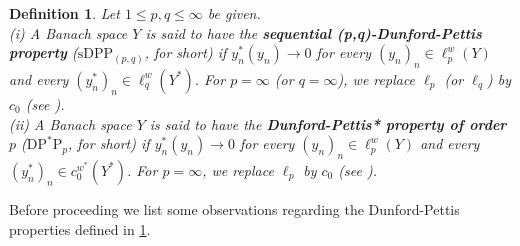 \documentclass[12 pt]{article}%
\newtheorem{final remark}[theorem]{Final Remark}
\newtheorem{definition}[theorem]{Definition}
\begin{document}
\begin{definition} \label{dppdef} \rm
    Let $1 \leq p, q \leq \infty$ be given. \\
    {\rm (i)} A Banach space $Y$ is said to have the {\bf sequential (p,q)-Dunford-Pettis property} ($\mathrm{sDPP}_{(p,q)}$, for short) if $y_n^*(y_n) \to 0$ for every $(y_n)_n \in \ell_p^w(Y)$ and every $(y_n^*)_n \in \ell_q^w( Y^*)$. For $p = \infty$ (or $q = \infty$), we replace $\ell_p$ (or $\ell_q$) by $c_0$ (see \cite[Definition 1.8]{gab2024}). \\
    {\rm (ii)} A Banach space $Y$ is said to have the {\bf Dunford-Pettis* property of order $p$} ($\mathrm{DP}^*\mathrm{P}_p$, for short) if  $y_n^*(y_n) \to 0$ for every $(y_n)_n \in \ell_p^w(Y)$ and every $(y_n^*)_n \in c_0^{w^*}(Y^*)$. For $p=\infty$, we replace $\ell_p$ by $c_0$ (see \cite[Theorem 2.4]{zeefou14}).
\end{definition}

Before proceeding we list some observations regarding the Dunford-Pettis properties defined in \ref{dppdef}.
\end{document}
